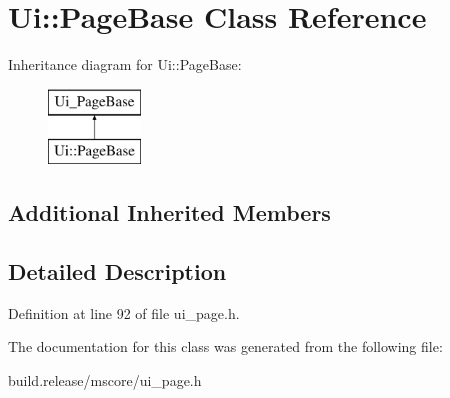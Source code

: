\hypertarget{class_ui_1_1_page_base}{}\section{Ui\+:\+:Page\+Base Class Reference}
\label{class_ui_1_1_page_base}
Inheritance diagram for Ui\+:\+:Page\+Base\+:\begin{figure}[H]
\begin{center}
\leavevmode
\includegraphics[height=2.000000cm]{class_ui_1_1_page_base}
\end{center}
\end{figure}
\subsection*{Additional Inherited Members}


\subsection{Detailed Description}


Definition at line 92 of file ui\+\_\+page.\+h.



The documentation for this class was generated from the following file\+:\begin{DoxyCompactItemize}
\item 
build.\+release/mscore/ui\+\_\+page.\+h\end{DoxyCompactItemize}
